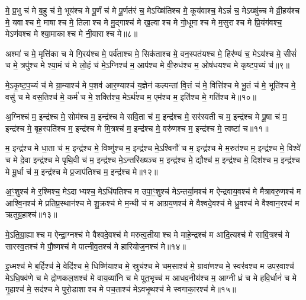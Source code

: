 मे॒ प्र॒भु च॑ मे ब॒हु च॑ मे॒ भूय॑श्च मे पू॒र्णं च॑ मे पू॒र्णत॑रं च॒ मेऽख्षि॑तिश्च मे॒ कूय॑वाश्च॒ मेऽन्नं॑ च॒ मेऽख्षु॑च्च मे व्री॒हय॑श्च मे॒ यवाश्च मे॒ माषाश्च मे॒ तिलाश्च मे मु॒द्गाश्च॑ मे ख॒ल्वाश्च मे गो॒धूमाश्च मे म॒सुराश्च मे प्रि॒यंग॑वश्च॒ मेऽण॑वश्च मे श्या॒माकाश्च मे नी॒वाराश्च मे॥८॥

{\anuvakamend[{वि॒भु च॑ म॒सुरा॒श्चतु॑र्दश च॥४॥}]}

अश्मा॑ च मे॒ मृत्ति॑का च मे गि॒रय॑श्च मे॒ पर्व॑ताश्च मे॒ सिक॑ताश्च मे॒ वन॒स्पत॑यश्च मे॒ हिर॑ण्यं च॒ मेऽय॑श्च मे॒ सीसं॑ च मे॒ त्रपु॑श्च मे श्या॒मं च॑ मे लो॒हं च॑ मे॒ऽग्निश्च॑ म॒ आप॑श्च मे वी॒रुध॑श्च म॒ ओष॑धयश्च मे कृष्टप॒च्यं च॑॥९॥

मे॒ऽकृ॒ष्ट॒प॒च्यं च॑ मे ग्रा॒म्याश्च॑ मे प॒शव॑ आर॒ण्याश्च॑ य॒ज्ञेन॑ कल्पन्तां वि॒त्तं च॑ मे॒ वित्ति॑श्च मे भू॒तं च॑ मे॒ भूति॑श्च मे॒ वसु॑ च मे वस॒तिश्च॑ मे॒ कर्म॑ च मे॒ शक्ति॑श्च॒ मेऽर्थ॑श्च म॒ एम॑श्च म॒ इति॑श्च मे॒ गति॑श्च मे॥१०॥

{\anuvakamend[{कृ॒ष्ट॒प॒च्यञ्चा॒ष्टाच॑त्वारिशच्च॥५॥}]}

अ॒ग्निश्च॑ म॒ इन्द्र॑श्च मे॒ सोम॑श्च म॒ इन्द्र॑श्च मे सवि॒ता च॑ म॒ इन्द्र॑श्च मे॒ सर॑स्वती च म॒ इन्द्र॑श्च मे पू॒षा च॑ म॒ इन्द्र॑श्च मे॒ बृह॒स्पति॑श्च म॒ इन्द्र॑श्च मे मि॒त्रश्च॑ म॒ इन्द्र॑श्च मे॒ वरु॑णश्च म॒ इन्द्र॑श्च मे॒ त्वष्टा॑ च॥११॥

म॒ इन्द्र॑श्च मे धा॒ता च॑ म॒ इन्द्र॑श्च मे॒ विष्णु॑श्च म॒ इन्द्र॑श्च मे॒ऽश्विनौ॑ च म॒ इन्द्र॑श्च मे म॒रुत॑श्च म॒ इन्द्र॑श्च मे॒ विश्वे॑ च मे दे॒वा इन्द्र॑श्च मे पृथि॒वी च॑ म॒ इन्द्र॑श्च मे॒ऽन्तरि॑ख्षञ्च म॒ इन्द्र॑श्च मे॒ द्यौश्च॑ म॒ इन्द्र॑श्च मे॒ दिश॑श्च म॒ इन्द्र॑श्च मे मू॒र्धा च॑ म॒ इन्द्र॑श्च मे प्र॒जाप॑तिश्च म॒ इन्द्र॑श्च मे॥१२॥

{\anuvakamend[{त्वष्टा॑ च॒ द्यौश्च॑ म॒ एक॑विशतिश्च॥६॥}]}

अ॒ꣳ॒शुश्च॑ मे र॒श्मिश्च॒ मेऽदाभ्यश्च॒ मेऽधि॑पतिश्च म उपा॒ꣳ॒शुश्च॑ मेऽन्तर्या॒मश्च॑ म ऐन्द्रवाय॒वश्च॑ मे मैत्रावरु॒णश्च॑ म आश्वि॒नश्च॑ मे प्रतिप्र॒स्थान॑श्च मे शु॒क्रश्च॑ मे म॒न्थी च॑ म आग्रय॒णश्च॑ मे वैश्वदे॒वश्च॑ मे ध्रु॒वश्च॑ मे वैश्वान॒रश्च॑ म ऋतुग्र॒हाश्च॑॥१३॥

मे॒ऽति॒ग्रा॒ह्याश्च म ऐन्द्रा॒ग्नश्च॑ मे वैश्वदे॒वश्च॑ मे मरुत्व॒तीयाश्च मे माहे॒न्द्रश्च॑ म आदि॒त्यश्च॑ मे सावि॒त्रश्च॑ मे सारस्व॒तश्च॑ मे पौ॒ष्णश्च॑ मे पात्नीव॒तश्च॑ मे हारियोज॒नश्च॑ मे॥१४॥

{\anuvakamend[{ऋ॒तु॒ग्र॒हाश्च॒ चतु॑स्त्रिशच्च॥७॥}]}

इ॒ध्मश्च॑ मे ब॒र्\mbox{}हिश्च॑ मे॒ वेदि॑श्च मे॒ धिष्णि॑याश्च मे॒ स्रुच॑श्च मे चम॒साश्च॑ मे॒ ग्रावा॑णश्च मे॒ स्वर॑वश्च म उपर॒वाश्च॑ मेऽधि॒षव॑णे च मे द्रोणकल॒शश्च॑ मे वाय॒व्या॑नि च मे पूत॒भृच्च॑ म आधव॒नीय॑श्च म॒ आग्नीध्रं च मे हवि॒र्धानं॑ च मे गृ॒हाश्च॑ मे॒ सद॑श्च मे पुरो॒डाशाश्च मे पच॒ताश्च॑ मेऽवभृ॒थश्च॑ मे स्वगाका॒रश्च॑ मे॥१५॥

